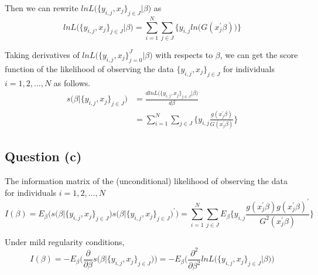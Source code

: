 \documentclass{article}
\begin{document}
Then we can rewrite $ln L\bigg(\{ y_{i,j}, x_j \}_{j \in J} \bigg| \beta \bigg) $ as 
\begin{equation*}
lnL\bigg(\{ y_{i,j}, x_j \}_{j \in J} \bigg| \beta \bigg) = \sum_{i = 1}^{N} \sum_{j \in J} \bigg\{  y_{i,j} ln \bigg( G(x_j^\prime \beta) \bigg) \bigg\}
\end{equation*}

Taking derivatives of $lnL\bigg(\{ y_{i,j}, x_j \}_{j = 0}^J \bigg| \beta \bigg)$ with respects to $\beta$, we can get the score function of the likelihood of observing the data $\{ y_{i,j}, x_j \}_{j \in J}$ for individuals $i = 1, 2, ..., N$ as follows. 
\begin{equation*}
\begin{split}
s\bigg(\beta \bigg| \{ y_{i,j}, x_j \}_{j \in J} \bigg) & = \frac{d lnL \bigg(\{ y_{i,j}, x_j \}_{j \in J} \bigg| \beta \bigg) }{d \beta} \\
& = \sum_{i = 1}^{N}\sum_{j \in J} \bigg\{  y_{i,j} \frac{ g(x_j^\prime \beta) }{ G(x_j^\prime \beta) }  \bigg\}
\end{split}
\end{equation*}

\subsection*{Question (c)}
The information matrix of the (unconditional) likelihood of observing the data for
individuals $i = 1, 2, ..., N$ 
\begin{equation*}
I(\beta) = E_{\beta}\Bigg( s\bigg(\beta \bigg| \{ y_{i,j}, x_j \}_{j \in J} \bigg) s\bigg(\beta \bigg| \{ y_{i,j}, x_j \}_{j \in J} \bigg)^\prime \Bigg) = \sum_{i = 1}^{N}\sum_{j \in J} E_{\beta}\bigg\{  y_{i,j} \frac{ g(x_j^\prime \beta) g(x_j^\prime \beta)^\prime}{ G^2(x_j^\prime \beta) }  \bigg\}
\end{equation*}

Under mild regularity conditions, 
\begin{equation*}
I(\beta) = - E_{\beta} \Bigg( \frac{\partial}{\partial \beta} s\bigg(\beta \bigg| \{ y_{i,j}, x_j \}_{j \in J} \bigg) \Bigg) = - E_{\beta} \Bigg( \frac{\partial^2}{\partial \beta^2} lnL\bigg(\{ y_{i,j}, x_j \}_{j \in J} \bigg| \beta \bigg) \Bigg)
\end{equation*}
\end{document}
